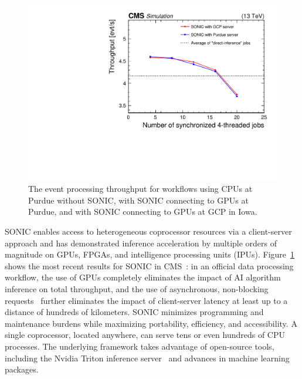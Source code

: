 \begin{figure}[htb!]
\centering
\includegraphics[width=0.5\myfigurewidth]{figures/MLG-23-001_Figure_009.pdf}
\caption{The event processing throughput for workflows using CPUs at Purdue without SONIC, with SONIC connecting to GPUs at Purdue, and with SONIC connecting to GPUs at GCP in Iowa.}
\label{fig:sonic}
\end{figure}

SONIC enables access to heterogeneous coprocessor resources via a client-server approach
and has demonstrated inference acceleration by multiple orders of magnitude on GPUs, FPGAs, and intelligence processing units (IPUs).
Figure~\ref{fig:sonic} shows the most recent results for SONIC in CMS~\cite{}:
in an official data processing workflow, the use of GPUs completely eliminates the impact of AI algorithm inference on total throughput,
and the use of asynchronous, non-blocking requests~\cite{Bocci:2020olh} further eliminates the impact of client-server latency at least up to a distance of hundreds of kilometers.
SONIC minimizes programming and maintenance burdens while maximizing portability, efficiency, and accessibility.
A single coprocessor, located anywhere, can serve tens or even hundreds of CPU processes.
The underlying framework takes advantage of open-source tools, including the Nvidia Triton inference server~\cite{nvidia} and advances in machine learning packages.

